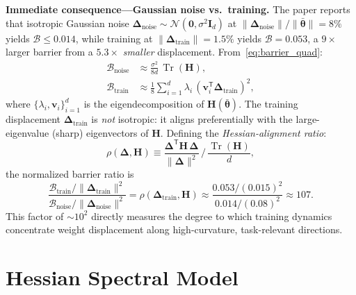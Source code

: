 \documentclass{article}
\DeclareMathOperator{\Tr}{Tr}
\newcommand{\Hess}{\mathbf{H}}
\newcommand{\btheta}{\bm{\theta}}
\newcommand{\bDelta}{\bm{\Delta}}
\begin{document}
\medskip\noindent
\textbf{Immediate consequence---Gaussian noise vs.\ training.}
The paper reports that isotropic Gaussian noise $\bDelta_{\mathrm{noise}}\sim\mathcal{N}(\bm{0},\sigma^2\mathbf{I}_d)$
at $\|\bDelta_{\mathrm{noise}}\|/\|\bar{\btheta}\|=8\%$ yields $\mathcal{B}\leq0.014$, while training
at $\|\bDelta_{\mathrm{train}}\|=1.5\%$ yields $\mathcal{B}=0.053$, a $9\times$ larger barrier from
a $5.3\times$ \emph{smaller} displacement. From~\eqref{eq:barrier_quad}:
\begin{align}
\mathcal{B}_{\mathrm{noise}} &\approx \frac{\sigma^2}{8d}\,\Tr(\Hess), \label{eq:noise}\\
\mathcal{B}_{\mathrm{train}} &\approx \frac{1}{8}\sum_{i=1}^d \lambda_i\,(\mathbf{v}_i^{\mathsf T}\bDelta_{\mathrm{train}})^2,
\label{eq:train}
\end{align}
where $\{\lambda_i,\mathbf{v}_i\}_{i=1}^d$ is the eigendecomposition of $\Hess(\bar{\btheta})$.
The training displacement $\bDelta_{\mathrm{train}}$ is \emph{not} isotropic: it aligns
preferentially with the large-eigenvalue (sharp) eigenvectors of $\Hess$. Defining the
\emph{Hessian-alignment ratio}:
\begin{equation}
\boxed{\rho(\bDelta,\Hess) \equiv \frac{\bDelta^{\mathsf T}\Hess\,\bDelta}{\|\bDelta\|^2}\,
\Big/\,\frac{\Tr(\Hess)}{d},}
\end{equation}
the normalized barrier ratio is
\begin{equation}
\frac{\mathcal{B}_{\mathrm{train}} / \|\bDelta_{\mathrm{train}}\|^2}
{\mathcal{B}_{\mathrm{noise}} / \|\bDelta_{\mathrm{noise}}\|^2}
= \rho(\bDelta_{\mathrm{train}},\Hess) \approx \frac{0.053/(0.015)^2}{0.014/(0.08)^2}
\approx 107.
\end{equation}
This factor of $\sim\!10^2$ directly measures the degree to which training dynamics
concentrate weight displacement along high-curvature, task-relevant directions.

\section{Hessian Spectral Model}
\end{document}
